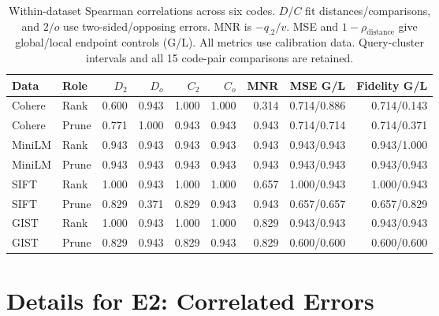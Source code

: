 \begin{table}[tbp]
\centering
\small
\setlength{\tabcolsep}{3pt}
\begin{tabular}{llrrrrrrr}
\toprule
Data & Role & $D_2$ & $D_o$ & $C_2$ & $C_o$ & MNR & MSE G/L & Fidelity G/L \\
\midrule
Cohere & Rank & 0.600 & 0.943 & 1.000 & 1.000 & 0.314 & 0.714/0.886 & 0.714/0.143 \\
Cohere & Prune & 0.771 & 1.000 & 0.943 & 0.943 & 0.943 & 0.714/0.714 & 0.714/0.371 \\
MiniLM & Rank & 0.943 & 0.943 & 0.943 & 0.943 & 0.943 & 0.943/0.943 & 0.943/1.000 \\
MiniLM & Prune & 0.943 & 0.943 & 0.943 & 0.943 & 0.943 & 0.943/0.943 & 0.943/0.943 \\
SIFT & Rank & 1.000 & 0.943 & 1.000 & 1.000 & 0.657 & 1.000/0.943 & 1.000/0.943 \\
SIFT & Prune & 0.829 & 0.371 & 0.829 & 0.943 & 0.943 & 0.657/0.657 & 0.657/0.829 \\
GIST & Rank & 1.000 & 0.943 & 1.000 & 1.000 & 0.829 & 0.943/0.943 & 0.943/0.943 \\
GIST & Prune & 0.829 & 0.943 & 0.829 & 0.943 & 0.829 & 0.600/0.600 & 0.600/0.600 \\
\bottomrule
\end{tabular}
\caption{Within-dataset Spearman correlations across six codes. $D/C$ fit distances/comparisons, and $2/o$ use two-sided/opposing errors. MNR is $-q_{.2}/v$. MSE and $1-\rho_{\mathrm{distance}}$ give global/local endpoint controls (G/L). All metrics use calibration data. Query-cluster intervals and all 15 code-pair comparisons are retained.}
\label{tab:app-six-code-choice}
\end{table}

\section{Details for E2: Correlated Errors}
\label{app:covariance}

